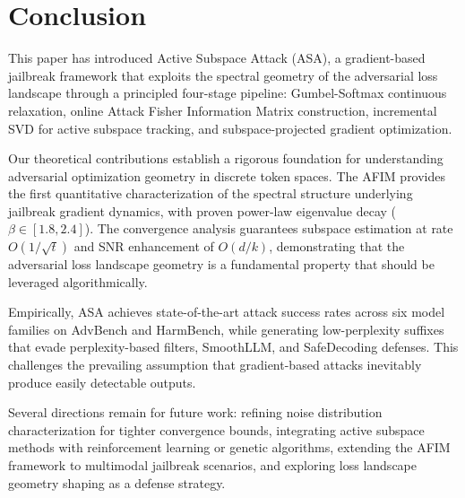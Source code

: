 \documentclass[preprint,12pt]{elsarticle}
\begin{document}

\section{Conclusion}
\label{sec:conclusion}

This paper has introduced Active Subspace Attack (ASA), a gradient-based jailbreak framework that exploits the spectral geometry of the adversarial loss landscape through a principled four-stage pipeline: Gumbel-Softmax continuous relaxation, online Attack Fisher Information Matrix construction, incremental SVD for active subspace tracking, and subspace-projected gradient optimization.

Our theoretical contributions establish a rigorous foundation for understanding adversarial optimization geometry in discrete token spaces. The AFIM provides the first quantitative characterization of the spectral structure underlying jailbreak gradient dynamics, with proven power-law eigenvalue decay ($\beta \in [1.8, 2.4]$). The convergence analysis guarantees subspace estimation at rate $O(1/\sqrt{t})$ and SNR enhancement of $O(d/k)$, demonstrating that the adversarial loss landscape geometry is a fundamental property that should be leveraged algorithmically.

Empirically, ASA achieves state-of-the-art attack success rates across six model families on AdvBench and HarmBench, while generating low-perplexity suffixes that evade perplexity-based filters, SmoothLLM, and SafeDecoding defenses. This challenges the prevailing assumption that gradient-based attacks inevitably produce easily detectable outputs.

Several directions remain for future work: refining noise distribution characterization for tighter convergence bounds, integrating active subspace methods with reinforcement learning or genetic algorithms, extending the AFIM framework to multimodal jailbreak scenarios, and exploring loss landscape geometry shaping as a defense strategy.





\end{document}
